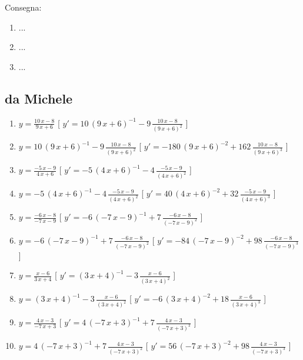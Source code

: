\begin{esercizio}\label{ese:03.2}
Consegna:
 \begin{enumerate}
  \item  ...
  \item ...
  \item ...
 \end{enumerate}
\end{esercizio}

\subsection{da Michele}
\begin{esercizio}
\begin{enumerate} 
\item $y= {\frac {10\,x-8}{9\,x+6}} $ \hfill [ $y'= 10\, \left( 9\,x+6 \right) ^{-1}-9\,{\frac {10\,x-8}{ \left( 9\,x+6 \right) ^{2}}}$ ]
\item $y= 10\, \left( 9\,x+6 \right) ^{-1}-9\,{\frac {10\,x-8}{ \left( 9\,x+6 \right) ^{2}}} $ \hfill [ $y'= -180\, \left( 9\,x+6 \right) ^{-2}+162\,{\frac {10\,x-8}{ \left( 9\,x+6 \right) ^{3}}}$ ]
\item $y= {\frac {-5\,x-9}{4\,x+6}} $ \hfill [ $y'= -5\, \left( 4\,x+6 \right) ^{-1}-4\,{\frac {-5\,x-9}{ \left( 4\,x+6 \right) ^{2}}}$ ]
\item $y= -5\, \left( 4\,x+6 \right) ^{-1}-4\,{\frac {-5\,x-9}{ \left( 4\,x+6 \right) ^{2}}} $ \hfill [ $y'= 40\, \left( 4\,x+6 \right) ^{-2}+32\,{\frac {-5\,x-9}{ \left( 4\,x+6 \right) ^{3}}}$ ]
\item $y= {\frac {-6\,x-8}{-7\,x-9}} $ \hfill [ $y'= -6\, \left( -7\,x-9 \right) ^{-1}+7\,{\frac {-6\,x-8}{ \left( -7\,x-9 \right) ^{2}}}$ ]
\item $y= -6\, \left( -7\,x-9 \right) ^{-1}+7\,{\frac {-6\,x-8}{ \left( -7\,x-9 \right) ^{2}}} $ \hfill [ $y'= -84\, \left( -7\,x-9 \right) ^{-2}+98\,{\frac {-6\,x-8}{ \left( -7\,x-9 \right) ^{3}}}$ ]
\item $y= {\frac {x-6}{3\,x+4}} $ \hfill [ $y'=  \left( 3\,x+4 \right) ^{-1}-3\,{\frac {x-6}{ \left( 3\,x+4 \right) ^{2}}}$ ]
\item $y=  \left( 3\,x+4 \right) ^{-1}-3\,{\frac {x-6}{ \left( 3\,x+4 \right) ^{2}}} $ \hfill [ $y'= -6\, \left( 3\,x+4 \right) ^{-2}+18\,{\frac {x-6}{ \left( 3\,x+4 \right) ^{3}}}$ ]
\item $y= {\frac {4\,x-3}{-7\,x+3}} $ \hfill [ $y'= 4\, \left( -7\,x+3 \right) ^{-1}+7\,{\frac {4\,x-3}{ \left( -7\,x+3 \right) ^{2}}}$ ]
\item $y= 4\, \left( -7\,x+3 \right) ^{-1}+7\,{\frac {4\,x-3}{ \left( -7\,x+3 \right) ^{2}}} $ \hfill [ $y'= 56\, \left( -7\,x+3 \right) ^{-2}+98\,{\frac {4\,x-3}{ \left( -7\,x+3 \right) ^{3}}}$ ]

\end{enumerate}
\end{esercizio}
